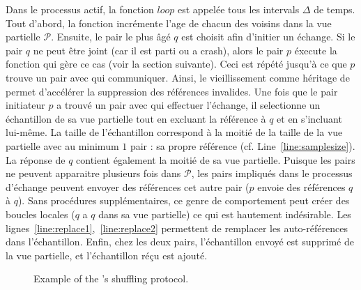Dans le processus actif, la fonction $loop$ est appelée tous les intervals
$\Delta$ de temps. Tout d'abord, la fonction incrémente l'age de chacun des
voisins dans la vue partielle $\mathcal{P}$. Ensuite, le pair le plus âgé $q$
est choisit afin d'initier un échange. Si le pair $q$ ne peut être joint (car il
est parti ou a crash), alors le pair $p$ éxecute la fonction qui gère ce cas
(voir la section suivante). Ceci est répété jusqu'à ce que $p$ trouve un pair
avec qui communiquer. Ainsi, le vieillissement comme héritage de \CYCLON permet
d'accélérer la suppression des références invalides. Une fois que le pair
initiateur $p$ a trouvé un pair avec qui effectuer l'échange, il selectionne un
échantillon de sa vue partielle tout en excluant la référence à $q$ et en
s'incluant lui-même. La taille de l'échantillon correspond à la moitié de la
taille de la vue partielle avec au minimum $1$ pair : sa propre référence
(cf. Line~\ref{line:samplesize}). La réponse de $q$ contient également la moitié
de sa vue partielle. Puisque les pairs ne peuvent apparaitre plusieurs fois dans
$\mathcal{P}$, les pairs impliqués dans le processus d'échange peuvent envoyer
des références cet autre pair ($p$ envoie des références $q$ à $q$). Sans
procédures supplémentaires, ce genre de comportement peut créer des boucles
locales ($q$ a $q$ dans sa vue partielle) ce qui est hautement indésirable. Les
lignes~\ref{line:replace1},~\ref{line:replace2} permettent de remplacer les
auto-références dans l'échantillon. Enfin, chez les deux pairs, l'échantillon envoyé 
est supprimé de la vue partielle, et l'échantillon réçu est ajouté.

\begin{figure*}
  \centering
  \hspace{10pt}
  \hspace{10pt}
  \caption{\label{fig:spray:cyclicexample}Example of the \SPRAY's shuffling
    protocol. }
\end{figure*}

